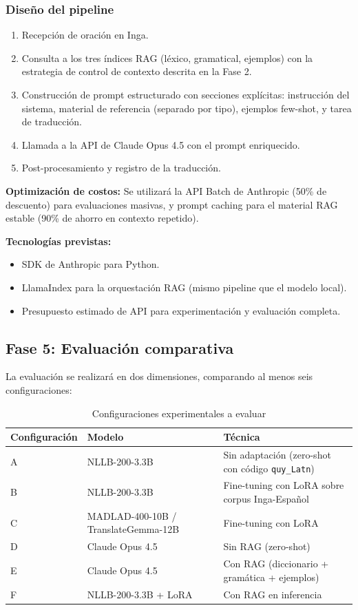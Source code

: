 \documentclass[12pt,a4paper]{article}
\begin{document}
\subsubsection{Diseño del pipeline}

\begin{enumerate}
    \item Recepción de oración en Inga.
    \item Consulta a los tres índices RAG (léxico, gramatical, ejemplos) con la estrategia de control de contexto descrita en la Fase 2.
    \item Construcción de prompt estructurado con secciones explícitas: instrucción del sistema, material de referencia (separado por tipo), ejemplos few-shot, y tarea de traducción.
    \item Llamada a la API de Claude Opus 4.5 con el prompt enriquecido.
    \item Post-procesamiento y registro de la traducción.
\end{enumerate}

\textbf{Optimización de costos:} Se utilizará la API Batch de Anthropic (50\% de descuento) para evaluaciones masivas, y prompt caching para el material RAG estable (90\% de ahorro en contexto repetido).

\textbf{Tecnologías previstas:}
\begin{itemize}
    \item SDK de Anthropic para Python.
    \item LlamaIndex para la orquestación RAG (mismo pipeline que el modelo local).
    \item Presupuesto estimado de API para experimentación y evaluación completa.
\end{itemize}

\subsection{Fase 5: Evaluación comparativa}

La evaluación se realizará en dos dimensiones, comparando al menos seis configuraciones:

\begin{table}[h]
\centering
\begin{tabular}{@{}lll@{}}
\toprule
\textbf{Configuración} & \textbf{Modelo} & \textbf{Técnica} \\
\midrule
A & NLLB-200-3.3B & Sin adaptación (zero-shot con código \texttt{quy\_Latn}) \\
B & NLLB-200-3.3B & Fine-tuning con LoRA sobre corpus Inga-Español \\
C & MADLAD-400-10B / TranslateGemma-12B & Fine-tuning con LoRA \\
D & Claude Opus 4.5 & Sin RAG (zero-shot) \\
E & Claude Opus 4.5 & Con RAG (diccionario + gramática + ejemplos) \\
F & NLLB-200-3.3B + LoRA & Con RAG en inferencia \\
\bottomrule
\end{tabular}
\caption{Configuraciones experimentales a evaluar}
\end{table}
\end{document}
